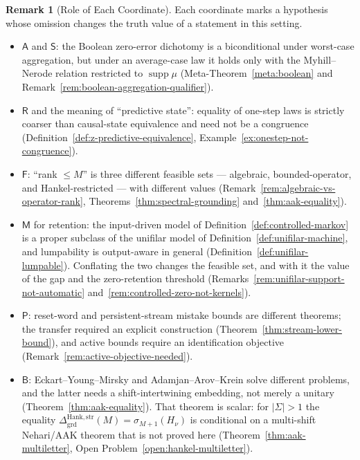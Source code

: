 \documentclass[12pt]{article}
\theoremstyle{definition}
\newtheorem{remark}[theorem]{Remark}
\newcommand{\DHankstr}{\Delta_{\mathrm{grd}}^{\mathrm{Hank,str}}}
\begin{document}
\begin{remark}[Role of Each Coordinate]
\label{rem:type-discipline-coordinates}
Each coordinate marks a hypothesis whose omission changes the truth value of a
statement in this setting.
\begin{itemize}[leftmargin=1.6em]
\item $\mathsf A$ and $\mathsf S$: the Boolean zero-error dichotomy is a
biconditional under worst-case aggregation, but under an average-case law it
holds only with the Myhill--Nerode relation restricted to $\operatorname{supp}\mu$
(Meta-Theorem~\ref{meta:boolean} and
Remark~\ref{rem:boolean-aggregation-qualifier}).
\item $\mathsf R$ and the meaning of ``predictive state'': equality of
one-step laws is strictly coarser than causal-state equivalence and need not
be a congruence (Definition~\ref{def:z-predictive-equivalence},
Example~\ref{ex:onestep-not-congruence}).
\item $\mathsf F$: ``rank $\le M$'' is three different feasible sets ---
algebraic, bounded-operator, and Hankel-restricted --- with
different values (Remark~\ref{rem:algebraic-vs-operator-rank},
Theorems~\ref{thm:spectral-grounding} and~\ref{thm:aak-equality}).
\item $\mathsf M$ for retention: the input-driven model of
Definition~\ref{def:controlled-markov} is a proper subclass of the unifilar
model of Definition~\ref{def:unifilar-machine}, and lumpability is output-aware
in general (Definition~\ref{def:unifilar-lumpable}).  Conflating the two
changes the feasible set, and with it the value of the gap and the
zero-retention threshold
(Remarks~\ref{rem:unifilar-support-not-automatic}
and~\ref{rem:controlled-zero-not-kernels}).
\item $\mathsf P$: reset-word and persistent-stream mistake bounds are
different theorems; the transfer required an explicit construction
(Theorem~\ref{thm:stream-lower-bound}), and active bounds require an
identification objective (Remark~\ref{rem:active-objective-needed}).
\item $\mathsf B$: Eckart--Young--Mirsky and Adamjan--Arov--Krein solve
different problems, and the latter needs a shift-intertwining embedding, not
merely a unitary (Theorem~\ref{thm:aak-equality}).  That theorem is scalar:
for $|\Sigma|>1$ the equality $\DHankstr(M)=\sigma_{M+1}(H_\nu)$ is
conditional on a multi-shift Nehari/AAK theorem that is not proved here
(Theorem~\ref{thm:aak-multiletter}, Open Problem~\ref{open:hankel-multiletter}).
\end{itemize}
\end{remark}
\end{document}
